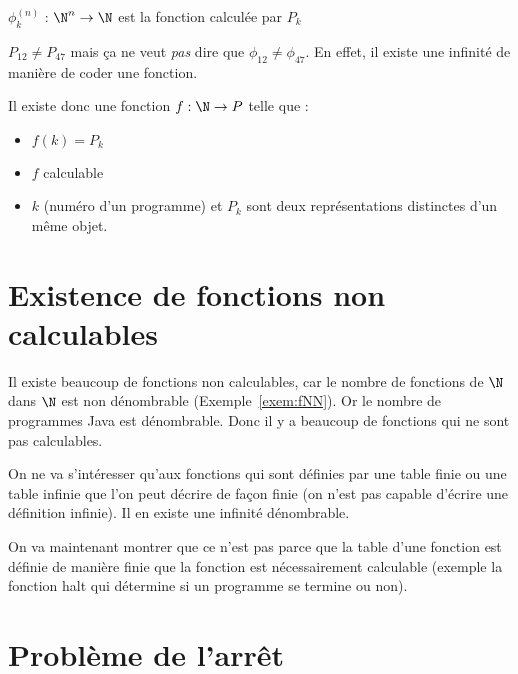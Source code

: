 \begin{mydef}[$\phi^{(n)}_k$]
	$\phi^{(n)}_k$ : $\N^n \rightarrow \N$ est la fonction calculée par $P_k$
\end{mydef}

\begin{myrem}
  $P_{12} \neq P_{47}$ mais ça ne veut \emph{pas} dire que $\phi_{12} \neq \phi_{47}$. En effet, il existe une infinité de manière de coder une fonction.
\end{myrem}

\begin{myprop}
	Il existe donc une fonction $f : \N\rightarrow P$ telle que :
	\begin{itemize}
		\item $f(k) = P_k$
		\item $f$ calculable
		\item $k$ (numéro d'un programme) et $P_k$ sont deux représentations
			distinctes d'un même objet.
	\end{itemize}
\end{myprop}


\section{Existence de fonctions non calculables}
\label{sub:existence_de_fonction_non_calculables}
Il existe beaucoup de fonctions non calculables, car le nombre de fonctions de $\N$ dans $\N$ est non dénombrable (Exemple~\ref{exem:fNN}).
Or le nombre de programmes Java est dénombrable.
Donc il y a beaucoup de fonctions qui ne sont pas calculables.

On ne va s'intéresser qu'aux fonctions qui sont définies par une table finie ou une table infinie que l'on peut décrire de façon finie (on n'est pas capable d'écrire une définition infinie). Il en existe une infinité dénombrable.

On va maintenant montrer que ce n'est pas parce que la table d'une fonction est définie de manière finie que la fonction est nécessairement calculable (exemple la fonction halt qui détermine si un programme se termine ou non).


\section{Problème de l'arrêt}
\label{sub:probl_me_de_l_arr_t}

